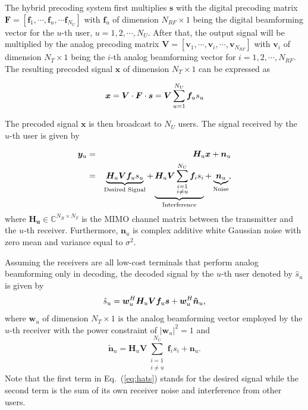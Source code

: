 \documentclass[conference]{IEEEtran}
\begin{document}
The hybrid precoding system first multiplies ${\bm s}$ with the digital precoding matrix $\bm{F}=\left[{\bm f}_1,\cdots,{\bm f}_u,\cdots{\bm f}_{N_U}\right]$ with ${\bm f}_u$ of dimension $N_{RF}\times 1$ being the digital beamforming vector for the $u$-th user, $u=1,2,\cdots,N_U$. After that, the output signal will be multiplied by the analog precoding matrix $\bm{V}=\left[{\bm v}_1,\cdots,{\bm v}_i,\cdots,{\bm v}_{N_{RF}}\right]$ with ${\bm v}_i$ of dimension $N_T\times 1$ being the $i$-th analog beamforming vector for $i=1,2,\cdots,N_{RF}$. The resulting precoded signal $\bm x$ of dimension $N_T\times 1$  can be expressed as

\begin{equation}{\label{eq:transx1}}
{\bm x} = \bm{V}\cdot \bm{F}\cdot\bm{s}= \bm{V}\sum_{u=1}^{N_U}\bm{f}_us_u
\end{equation}

The precoded signal $\bm x$ is then broadcast to $N_U$ users. The signal received by the $u$-th user is given by

\begin{eqnarray}{\label{eq:transx2}}
{\bm y}_u &=& \bm{H}_u \bm{x} + \bm{n}_u \nonumber\\
&=&\underbrace{\bm{H}_u \bm{V}\bm{f}_us_u}_\text{Desired Signal}+\underbrace{\bm{H}_u \bm{V}\sum_{\substack{i=1 \\ i\neq u}}^{N_U}\bm{f}_is_i}_\text{Interference}+\underbrace{\bm{n}_u}_\text{Noise},
\end{eqnarray}
where $\bm{H_u}$$\in\mathbb{C}^{N_R\times N_T}$ is the MIMO channel matrix between the transmitter and the $u$-th receiver\cite{el2014spatially}. Furthermore, $\bm{n}_u$ is complex additive white Gaussian noise with zero mean and variance equal to $\sigma^2$.

Assuming the receivers are all low-cost terminals that perform analog beamforming only in decoding, the decoded signal by the $u$-th user denoted by $\hat{s}_u$ is given by
\begin{equation}{\label{eq:hats}}
\hat{s}_u = \bm{w}_u^H \bm{H}_u \bm{V} \bm{f}_{u} \bm{s} + \bm{w}_u^H \bm{\tilde{n}}_u,
\end{equation}
where ${\bm w}_u$ of dimension $N_T\times 1$ is the analog beamforming vector employed by the $u$-th receiver with the power constraint of $|\bm{w}_u|^2=1$ and
\begin{equation}
\bm{\tilde{n}}_u=\bm{H}_u \bm{V}\sum_{\substack{i=1 \\ i\neq u}}^{N_U}\bm{f}_is_i+\bm{n}_u.
\end{equation}
Note that the first term in Eq.~(\ref{eq:hats}) stands for the desired signal while the second term is the sum of its own receiver noise and interference from other users.
\end{document}

